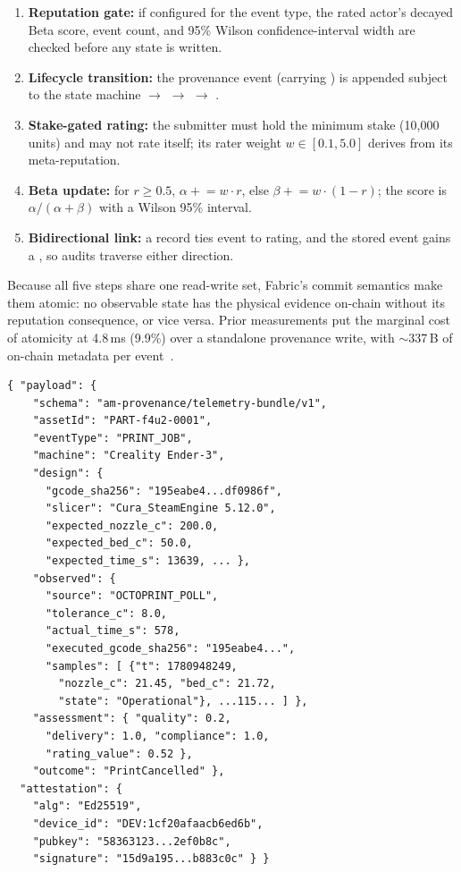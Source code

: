 \begin{enumerate}
  \item \textbf{Reputation gate:} if configured for the event type, the
        rated actor's decayed Beta score, event count, and 95\% Wilson
        confidence-interval width are checked before any state is written.
  \item \textbf{Lifecycle transition:} the provenance event (carrying
        ) is appended subject to the state machine
         $\rightarrow$ 
        $\rightarrow$  $\rightarrow$
        .
  \item \textbf{Stake-gated rating:} the submitter must hold the minimum
        stake (10{,}000 units) and may not rate itself; its rater weight
        $w \in [0.1, 5.0]$ derives from its meta-reputation.
  \item \textbf{Beta update:} for $r \geq 0.5$, $\alpha \mathrel{+}= w
        \cdot r$, else $\beta \mathrel{+}= w \cdot (1-r)$; the score is
        $\alpha/(\alpha+\beta)$ with a Wilson 95\% interval.
  \item \textbf{Bidirectional link:} a
         record ties event to rating, and the
        stored event gains a , so audits traverse
        either direction.
\end{enumerate}

Because all five steps share one read-write set, Fabric's commit
semantics make them atomic: no observable state has the physical evidence
on-chain without its reputation consequence, or vice versa.  Prior
measurements put the marginal cost of atomicity at 4.8\,ms (9.9\%) over a
standalone provenance write, with $\sim$337\,B of on-chain metadata per
event~\cite{anonymous2026unified}.

\begin{lstlisting}[float=t, caption={Canonical signed
bundle (abbreviated; real values from the captured run of
Section~\ref{sec:eval_capture}).  The on-chain commitment is the SHA-256
of this object's canonical serialization.}, label={lst:bundle}]
{ "payload": {
    "schema": "am-provenance/telemetry-bundle/v1",
    "assetId": "PART-f4u2-0001",
    "eventType": "PRINT_JOB",
    "machine": "Creality Ender-3",
    "design": {
      "gcode_sha256": "195eabe4...df0986f",
      "slicer": "Cura_SteamEngine 5.12.0",
      "expected_nozzle_c": 200.0,
      "expected_bed_c": 50.0,
      "expected_time_s": 13639, ... },
    "observed": {
      "source": "OCTOPRINT_POLL",
      "tolerance_c": 8.0,
      "actual_time_s": 578,
      "executed_gcode_sha256": "195eabe4...",
      "samples": [ {"t": 1780948249,
        "nozzle_c": 21.45, "bed_c": 21.72,
        "state": "Operational"}, ...115... ] },
    "assessment": { "quality": 0.2,
      "delivery": 1.0, "compliance": 1.0,
      "rating_value": 0.52 },
    "outcome": "PrintCancelled" },
  "attestation": {
    "alg": "Ed25519",
    "device_id": "DEV:1cf20afaacb6ed6b",
    "pubkey": "58363123...2ef0b8c",
    "signature": "15d9a195...b883c0c" } }
\end{lstlisting}
